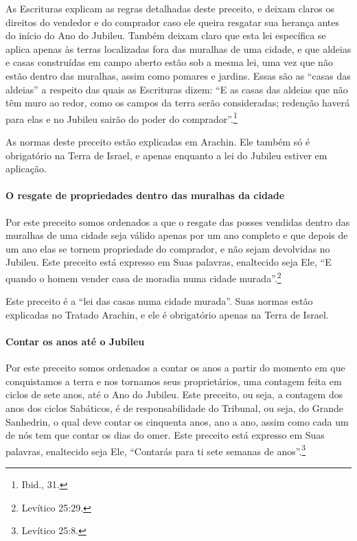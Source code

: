 \begin{multicols}{2}
As Escrituras explicam as regras detalhadas deste preceito, e deixam
claros os direitos do vendedor e do comprador caso ele queira resgatar
sua herança antes do início do Ano do Jubileu. Também deixam claro que
esta lei específica se aplica apenas às terras localizadas fora das
muralhas de uma cidade, e que aldeias e casas construídas em campo
aberto estão sob a mesma lei, uma vez que não estão dentro das muralhas,
assim como pomares e jardins. Essas são as ``casas das aldeias'' a
respeito das quais as Escrituras dizem: ``E as casas das aldeias que não
têm muro ao redor, como os campos da terra serão consideradas; redenção
haverá para elas e no Jubileu sairão do poder do comprador''.\footnote{Ibid., 31.}

As normas deste preceito estão explicadas em Arachin\starr. Ele também só é
obrigatório na Terra de Israel, e apenas enquanto a lei do Jubileu
estiver em aplicação.

\paragraph{O resgate de propriedades dentro das muralhas da cidade}

Por este preceito somos ordenados a que o resgate das posses vendidas
dentro das muralhas de uma cidade seja válido apenas por um ano
completo e que depois de um ano elas se tornem propriedade do
comprador, e não sejam devolvidas no Jubileu. Este preceito está
expresso em Suas palavras, enaltecido seja Ele, ``E quando o homem
vender casa de moradia numa cidade murada''.\footnote{Levítico 25:29.}

Este preceito é a ``lei das casas numa cidade murada''. Suas normas
estão explicadas no Tratado Arachin\starr, e ele é obrigatório apenas na Terra
de Israel.

\paragraph{Contar os anos até o Jubileu}

Por este preceito somos ordenados a contar os anos a partir do momento
em que conquistamos a terra e nos tornamos seus proprietários, uma
contagem feita em ciclos de sete anos, até o Ano do Jubileu. Este
preceito, ou seja, a contagem dos anos dos ciclos Sabáticos, é de
responsabilidade do Tribunal, ou seja, do Grande Sanhedrin\starr, o qual deve
contar os cinquenta anos, ano a ano, assim como cada um de nós tem que
contar os dias do omer\starr. Este preceito está expresso em Suas
palavras, enaltecido seja Ele, ``Contarás para ti sete semanas de anos''.\footnote{Levítico 25:8.}


\end{multicols}
